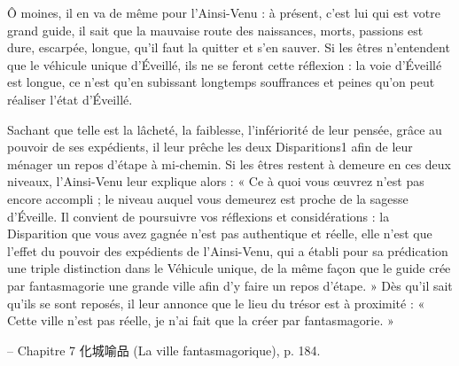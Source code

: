 \begin{singlequote}
Ô moines, il en va de même pour l’Ainsi-Venu : à présent, c’est lui qui est votre grand guide, il sait que la mauvaise route des naissances, morts, passions est dure, escarpée, longue, qu’il faut la quitter et s’en sauver. Si les êtres n’entendent que le véhicule unique d’Éveillé, ils ne se feront cette réflexion : la voie d’Éveillé est longue, ce n’est qu’en subissant longtemps souffrances et peines qu’on peut réaliser l’état d’Éveillé.

Sachant que telle est la lâcheté, la faiblesse, l’infériorité de leur pensée, grâce au pouvoir de ses expédients, il leur prêche les deux Disparitions1 afin de leur ménager un repos d’étape à mi-chemin. Si les êtres restent à demeure en ces deux niveaux, l’Ainsi-Venu leur explique alors :
« Ce à quoi vous œuvrez n’est pas encore accompli ; le niveau auquel vous demeurez est proche de la sagesse d’Éveille. Il convient de poursuivre vos réflexions et considérations : la Disparition que vous avez gagnée n’est pas authentique et réelle, elle n’est que l’effet du pouvoir des expédients de l’Ainsi-Venu, qui a établi pour sa prédication une triple distinction dans le Véhicule unique, de la même façon que le guide crée par fantasmagorie une grande ville afin d’y faire un repos d’étape. » Dès qu’il sait qu’ils se sont reposés, il leur annonce que le lieu du trésor est à proximité : « Cette ville n’est pas réelle, je n’ai fait que la créer par fantasmagorie. »

-- Chapitre 7 化城喻品 (La ville fantasmagorique), p. 184.
\end{singlequote}



